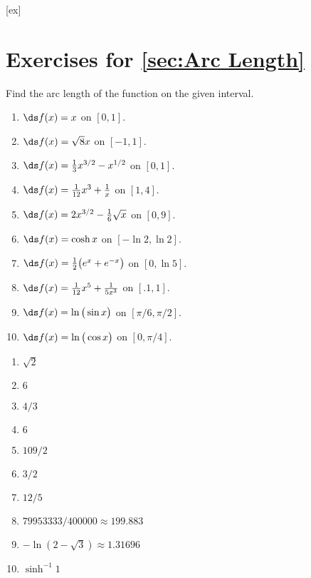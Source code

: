 [ex]
\section*{Exercises for \ref{sec:Arc Length}}

\begin{enumialphparenastyle}

\begin{ex}
Find the arc length of the function on the given interval.
\begin{enumerate}
\item {$\ds f(x) = x$ on $[0, 1]$.}


\item {$\ds f(x) = \sqrt{8}x$ on $[-1, 1]$.}


\item {$\ds f(x) = \frac13x^{3/2}-x^{1/2}$ on $[0,1]$.}

\item {$\ds f(x) = \frac1{12}x^{3}+\frac1x$ on $[1,4]$.}


\item {$\ds f(x) = 2x^{3/2}-\frac16\sqrt{x}$ on $[0,9]$.}


\item {$\ds f(x) = \cosh x$ on $[-\ln 2, \ln 2]$.}


\item {$\ds f(x) = \frac12\big(e^x+e^{-x}\big)$ on $[0, \ln 5]$.}


\item {$\ds f(x) = \frac1{12}x^5+\frac1{5x^3}$ on $[.1, 1]$.}


\item {$\ds f(x) = \ln \big(\sin x\big)$ on $[\pi/6, \pi/2]$.}


\item {$\ds f(x) = \ln \big(\cos x\big)$ on $[0, \pi/4]$.}

\end{enumerate}

\begin{sol}
\begin{enumerate}
\item {$\sqrt{2}$}
\item {$6$}
\item {$4/3$}
\item {$6$}
\item {$109/2$}
\item {$3/2$}
\item {$12/5$}
\item {$79953333/400000 \approx 199.883$}
\item {$-\ln (2-\sqrt{3}) \approx 1.31696$}
\item {$\sinh^{-1} 1$}
\end{enumerate}
\end{sol}


\end{ex}
\end{enumialphparenastyle}
